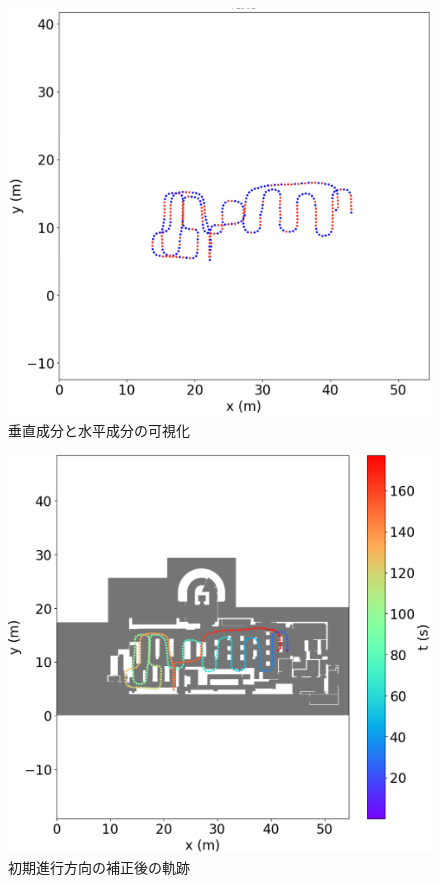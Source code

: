 \begin{figure}[ht]
	\centering
	\includegraphics[width=\linewidth]{image/rb.jpg}
	\caption{垂直成分と水平成分の可視化}    \label{fig:color}
\end{figure}

\begin{figure}[ht]
	\centering
	\includegraphics[width=\linewidth]{image/pdr-rotate.jpg}
	\caption{初期進行方向の補正後の軌跡}    \label{fig:pdr-rotate}
\end{figure}




